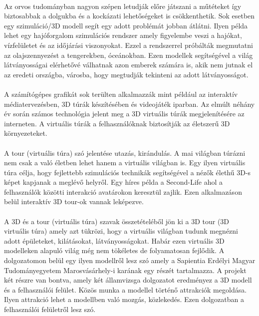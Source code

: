 \paragraph{}
Az orvos tudományban nagyon szépen letudják előre játszani a műtéteket így biztosabbak a dolgukba és a kockázati lehetőségeket is csökkenthetik. Sok esetben egy szimuláció/3D modell segít egy adott problémát jobban átlátni. Ilyen példa lehet egy hajóforgalom szimulációs rendszer \cite{dedov2017design} amely figyelembe veszi a hajókat, vízfelületet és az időjárási viszonyokat. Ezzel a rendszerrel próbálták megmutatni az olajszennyezést a tengerekben, óceánokban. Ezen modellek segítségével a világ látványosságai elérhetővé válhatnak azon emberek számára is, akik nem jutnak el az eredeti országba, városba, hogy megtudják tekinteni az adott látványosságot.
\paragraph{}
A számítógépes grafikát \cite{moloo20163d} sok terülten alkalmazzák mint például az interaktív médiatervezésben, 3D túrák készítésében és videojáték iparban. Az elmúlt néhány év során számos technológia jelent meg a 3D virtuális túrák megjelenítésére az interneten. A virtuális túrák a felhasználóknak biztosítják az életszerű 3D környezeteket.
\paragraph{}
A tour (virtuális túra) szó jelentése utazás, kirándulás. A mai világban túrázni nem csak a való életben lehet hanem a virtuális világban is. Egy ilyen virtuális túra célja, hogy fejlettebb szimulációs technikák segítségével a nézők élethű 3D-s képet kapjanak a meglévő helyről. Egy híres példa a Second-Life \cite{moloo20163d} ahol a felhasználók közötti interakció avatárokon keresztül zajlik. Ezen alkalmazáson belül interaktív 3D tour-ok vannak leképezve.
\paragraph{}
A 3D és a tour (virtuális túra) szavak összetételéből jön ki a 3D tour (3D virtuális túra) amely azt tükrözi, hogy a virtuális világban tudunk megnézni adott épületeket, kilátásokat, látványosságokat. Habár ezen virtuális 3D modelleken alapuló világ még nem tökéletes de folyamatosan fejlődik. A dolgozatomon belül egy ilyen modellről lesz szó amely a Sapientia Erdélyi Magyar Tudományegyetem Marosvásárhely-i karának egy részét tartalmazza. A projekt két részre van bontva, amely két államvizsga dolgozatot eredményez a 3D modell és a felhasználói felület. Közös munka a modellel történő attrakciók megoldása. Ilyen attrakció lehet a modellben való mozgás, közlekedés. Ezen dolgozatban a felhasználói felületről lesz szó. 
